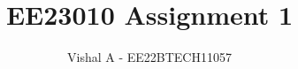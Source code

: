 \documentclass[journal,12pt,twocolumn]{IEEEtran}
\theoremstyle{remark}
\begin{document}
\let\vec\mathbf





\vspace{3cm}

\title{
EE23010 Assignment 1
}
\author{Vishal A - EE22BTECH11057}

	
	



%
%
%

% 
%



% 
\end{document}
